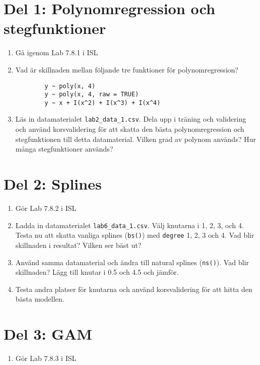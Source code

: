 \documentclass[a4paper]{article}
\begin{document}
\section*{Del 1: Polynomregression och stegfunktioner}

\begin{enumerate}
    \item Gå igenom Lab 7.8.1 i ISL
    \item Vad är skillnaden mellan följande tre funktioner för polynomregression?
    \begin{verbatim}
        y ~ poly(x, 4)
        y ~ poly(x, 4, raw = TRUE)
        y ~ x + I(x^2) + I(x^3) + I(x^4)
    \end{verbatim}
    \item Läs in datamaterialet \texttt{lab2\_data\_1.csv}. Dela upp i träning och validering och använd korsvalidering för att skatta den bästa polynomregression och stegfunktionen till detta datamaterial. Vilken grad av polynom används? Hur många stegfunktioner används?
\end{enumerate}

\section*{Del 2: Splines}

\begin{enumerate}
    \item Gör Lab 7.8.2 i ISL
    \item Ladda in datamaterialet \texttt{lab6\_data\_1.csv}. Välj knutarna i 1, 2, 3, och 4. Testa nu att skatta vanliga splines (\texttt{bs()}) med \texttt{degree} 1, 2, 3 och 4. Vad blir skillnaden i resultat? Vilken ser bäst ut?
    \item Använd samma datamaterial och ändra till natural splines (\texttt{ns()}). Vad blir skillnaden? Lägg till knutar i 0.5 och 4.5 och jämför.
    \item Testa andra platser för knutarna och använd korsvalidering för att hitta den bästa modellen.
\end{enumerate}

\section*{Del 3: GAM}
\begin{enumerate}
    \item Gör Lab 7.8.3 i ISL
\end{enumerate}
\end{document}
